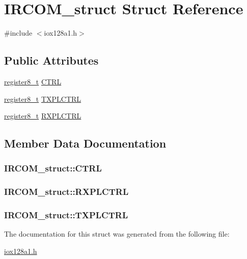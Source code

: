 \hypertarget{struct_i_r_c_o_m__struct}{
\section{IRCOM\_\-struct Struct Reference}
\label{struct_i_r_c_o_m__struct}
}


{\ttfamily \#include $<$iox128a1.h$>$}

\subsection*{Public Attributes}
\begin{DoxyCompactItemize}
\item 
\hyperlink{iox128a1_8h_a6a0649252b392263406882923b04a9db}{register8\_\-t} \hyperlink{struct_i_r_c_o_m__struct_ac293cc546f71f92370d34e094d9b49e0}{CTRL}
\item 
\hyperlink{iox128a1_8h_a6a0649252b392263406882923b04a9db}{register8\_\-t} \hyperlink{struct_i_r_c_o_m__struct_aeb8d4e3678d58352c60c286ca20017b0}{TXPLCTRL}
\item 
\hyperlink{iox128a1_8h_a6a0649252b392263406882923b04a9db}{register8\_\-t} \hyperlink{struct_i_r_c_o_m__struct_af70bc701a4eabe9161da7c222d30d7ca}{RXPLCTRL}
\end{DoxyCompactItemize}


\subsection{Member Data Documentation}
\hypertarget{struct_i_r_c_o_m__struct_ac293cc546f71f92370d34e094d9b49e0}{
\subsubsection[{CTRL}]{ {\bf IRCOM\_\-struct::CTRL}}}
\label{struct_i_r_c_o_m__struct_ac293cc546f71f92370d34e094d9b49e0}
\hypertarget{struct_i_r_c_o_m__struct_af70bc701a4eabe9161da7c222d30d7ca}{
\subsubsection[{RXPLCTRL}]{ {\bf IRCOM\_\-struct::RXPLCTRL}}}
\label{struct_i_r_c_o_m__struct_af70bc701a4eabe9161da7c222d30d7ca}
\hypertarget{struct_i_r_c_o_m__struct_aeb8d4e3678d58352c60c286ca20017b0}{
\subsubsection[{TXPLCTRL}]{ {\bf IRCOM\_\-struct::TXPLCTRL}}}
\label{struct_i_r_c_o_m__struct_aeb8d4e3678d58352c60c286ca20017b0}


The documentation for this struct was generated from the following file:\begin{DoxyCompactItemize}
\item 
\hyperlink{iox128a1_8h}{iox128a1.h}\end{DoxyCompactItemize}
